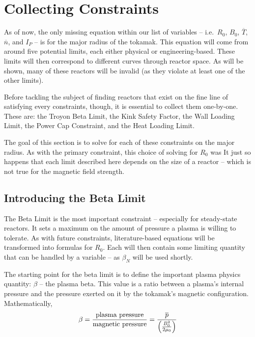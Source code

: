 \section{Collecting  Constraints}

As of now, the only missing equation within our list of  variables -- i.e.\ $R_0$, $B_0$, $\overline T$, $\overline n$, and $I_P$ -- is for the major radius of the tokamak. This equation will come from around five potential limits, each either physical or engineering-based. These limits will then correspond to different curves through reactor space. As will be shown, many of these reactors will be invalid (as they violate at least one of the other limits). 

Before tackling the subject of finding reactors that exist on the fine line of satisfying every  constraints, though, it is essential to collect them one-by-one. These are: the Troyon Beta Limit, the Kink Safety Factor, the Wall Loading Limit, the Power Cap Constraint, and the Heat Loading Limit. 

The goal of this section is to solve for each of these constraints on the major radius. As with the primary constraint, this choice of solving for $R_0$ was  It just so happens that each limit described here depends on the size of a reactor -- which is not true for the magnetic field strength.

\subsection{Introducing the Beta Limit}

The Beta Limit is the most important  constraint -- especially for steady-state reactors. It sets a maximum on the amount of pressure a plasma is willing to tolerate. As with future  constraints, literature-based equations will be transformed into formulas for $R_0$. Each will then contain some limiting quantity that can be handled by a  variable -- as $\beta_N$ will be used shortly.

The starting point for the beta limit is to define the important plasma physics quantity: $\beta$ -- the plasma beta. This value is a ratio between a plasma's internal pressure and the pressure exerted on it by the tokamak's magnetic configuration. Mathematically, \cite{jeff}
\begin{equation}
	\label{eq:beta}
	\beta = \frac{\textnormal{plasma pressure}}{\textnormal{magnetic pressure}} = \frac{ \overline p }{ \left( \frac{B_0^2}{2 \mu_0} \right) }
\end{equation}

